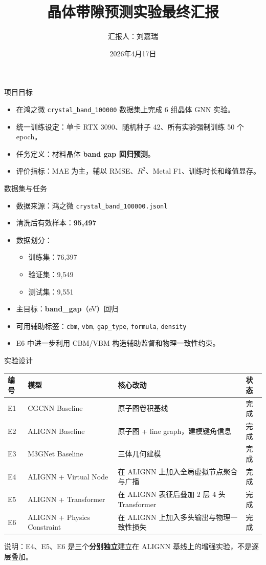 \documentclass{beamer}
\title[Matbench GNN 最终汇报]{晶体带隙预测实验最终汇报}
\author[刘嘉瑞]{汇报人：刘嘉瑞}
\institute[Band Gap]{项目：基于晶体图神经网络的 band gap 预测}
\date{2026年4月17日}
\begin{document}
\begin{frame}
 \titlepage
\end{frame}

\begin{frame}{项目目标}
\begin{itemize}
  \item 在鸿之微 \texttt{crystal\_band\_100000} 数据集上完成 6 组晶体 GNN 实验。
  \item 统一训练设定：单卡 RTX 3090、随机种子 42、所有实验强制训练 50 个 epoch。
  \item 任务定义：材料晶体 \textbf{band gap 回归预测}。
  \item 评价指标：MAE 为主，辅以 RMSE、$R^2$、Metal F1、训练时长和峰值显存。
\end{itemize}
\end{frame}

\begin{frame}{数据集与任务}
\small
\begin{itemize}
  \item 数据来源：鸿之微 \texttt{crystal\_band\_100000.jsonl}
  \item 清洗后有效样本：\textbf{95,497}
  \item 数据划分：
  \begin{itemize}
    \item 训练集：76,397
    \item 验证集：9,549
    \item 测试集：9,551
  \end{itemize}
  \item 主目标：\textbf{band\_gap}（eV）回归
  \item 可用辅助标签：\texttt{cbm}, \texttt{vbm}, \texttt{gap\_type}, \texttt{formula}, \texttt{density}
  \item E6 中进一步利用 CBM/VBM 构造辅助监督和物理一致性约束。
\end{itemize}
\end{frame}

\begin{frame}{实验设计}
\scriptsize
\centering
\setlength{\tabcolsep}{4pt}
\begin{tabular}{p{0.8cm} p{2.8cm} p{4.9cm} p{1.2cm}}
\toprule
编号 & 模型 & 核心改动 & 状态 \\
\midrule
E1 & CGCNN Baseline & 原子图卷积基线 & 完成 \\
E2 & ALIGNN Baseline & 原子图 + line graph，建模键角信息 & 完成 \\
E3 & M3GNet Baseline & 三体几何建模 & 完成 \\
E4 & ALIGNN + Virtual Node & 在 ALIGNN 上加入全局虚拟节点聚合与广播 & 完成 \\
E5 & ALIGNN + Transformer & 在 ALIGNN 表征后叠加 2 层 4 头 Transformer & 完成 \\
E6 & ALIGNN + Physics Constraint & 在 ALIGNN 上加入多头输出与物理一致性损失 & 完成 \\
\bottomrule
\end{tabular}

\vspace{2mm}
\footnotesize
说明：E4、E5、E6 是三个\textbf{分别独立}建立在 ALIGNN 基线上的增强实验，不是逐层叠加。
\end{frame}
\end{document}
